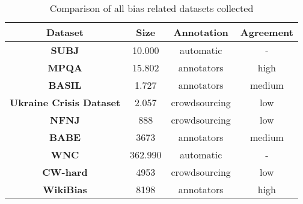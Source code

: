 \begin{table}
\begin{ctucolortab}
\begin{tabular}{c|c|c|c}
 \textbf{Dataset} & \textbf{Size} & \textbf{Annotation} & \textbf{Agreement}\\
 \hline
 \textbf{SUBJ} & 10.000 & automatic & -\\ 
 \hline
 \textbf{MPQA} & 15.802 & annotators & high \\
 \hline
 \textbf{BASIL} &  1.727 & annotators & medium \\ 
 \hline
 \textbf{Ukraine Crisis Dataset} & 2.057 & crowdsourcing & low \\ 
 \hline
 \textbf{NFNJ} & 888 & crowdsourcing & low \\
 \hline
 \textbf{BABE} & 3673 & annotators & medium \\
 \hline 
 \textbf{WNC} & 362.990 & automatic & - \\
 \hline
 \textbf{CW-hard} & 4953 & crowdsourcing & low \\
 \hline 
 \textbf{WikiBias} & 8198 & annotators & high \\
 \hline
\end{tabular}
\end{ctucolortab}
\caption{Comparison of all bias related datasets collected}
\label{table:1}
\end{table}